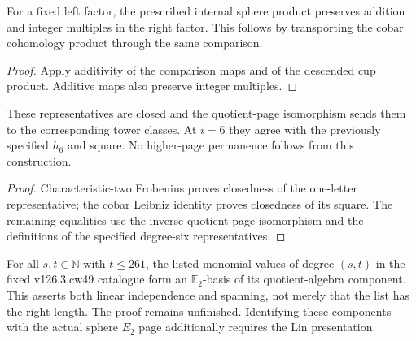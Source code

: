 \begin{proposition}
  \label{prop:internal-sphere-product-linearity}
  \leanok
  For a fixed left factor, the prescribed internal sphere product preserves
  addition and integer multiples in the right factor. This follows by
  transporting the cobar cohomology product through the same comparison.
\end{proposition}
\begin{proof}
  Apply additivity of the comparison maps and of the descended cup product.
  Additive maps also preserve integer multiples.
  \leanok
\end{proof}

\begin{proposition}
  \label{prop:milnor-internal-hi-family}
  \leanok
  These representatives are closed and the quotient-page isomorphism sends
  them to the corresponding tower classes. At $i=6$ they agree with the
  previously specified $h_6$ and square. No higher-page permanence follows
  from this construction.
\end{proposition}
\begin{proof}
  Characteristic-two Frobenius proves closedness of the one-letter
  representative; the cobar Leibniz identity proves closedness of its square.
  The remaining equalities use the inverse quotient-page isomorphism and
  the definitions of the specified degree-six representatives.
  \leanok
\end{proof}

\begin{theorem}
  \label{thm:lin-e2-basis-certification}
  \notready
  For all $s,t\in\mathbb N$ with $t\le261$, the listed monomial values of
  degree $(s,t)$ in the fixed v126.3.cw49 catalogue form an
  $\mathbb F_2$-basis of its quotient-algebra component. This asserts both
  linear independence and spanning, not merely that the list has the right
  length. The proof remains unfinished. Identifying these components
  with the actual sphere $E_2$ page additionally requires the Lin
  presentation.
\end{theorem}

